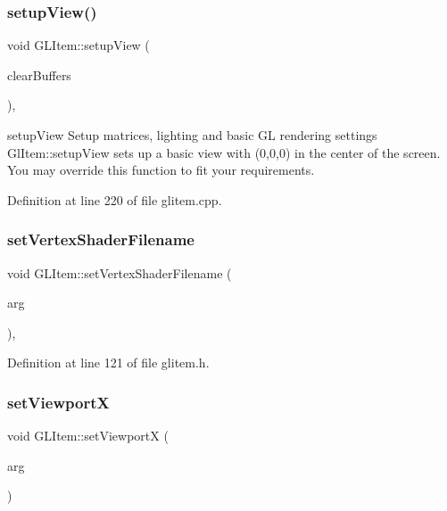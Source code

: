\subsubsection{\texorpdfstring{setupView()}{setupView()}}
{\footnotesize\ttfamily void G\+L\+Item\+::setup\+View (\begin{DoxyParamCaption}\item[{bool}]{clear\+Buffers }\end{DoxyParamCaption})\hspace{0.3cm}{\ttfamily [protected]}, {\ttfamily [virtual]}}



setup\+View Setup matrices, lighting and basic GL rendering settings Gl\+Item\+::setup\+View sets up a basic view with (0,0,0) in the center of the screen. You may override this function to fit your requirements. 



Definition at line 220 of file glitem.\+cpp.

\mbox{\label{class_g_l_item_afe9282e5b6619800867b757504b036f8}} 
\subsubsection{\texorpdfstring{setVertexShaderFilename}{setVertexShaderFilename}}
{\footnotesize\ttfamily void G\+L\+Item\+::set\+Vertex\+Shader\+Filename (\begin{DoxyParamCaption}\item[{Q\+String}]{arg }\end{DoxyParamCaption})\hspace{0.3cm}{\ttfamily [inline]}, {\ttfamily [slot]}}



Definition at line 121 of file glitem.\+h.

\mbox{\label{class_g_l_item_aacd52a7466b26509442d8f6b80d6e6d9}} 
\subsubsection{\texorpdfstring{setViewportX}{setViewportX}}
{\footnotesize\ttfamily void G\+L\+Item\+::set\+ViewportX (\begin{DoxyParamCaption}\item[{int}]{arg }\end{DoxyParamCaption})\hspace{0.3cm}{\ttfamily [slot]}}



